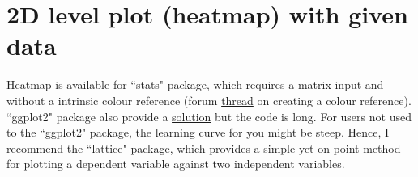 \documentclass[../note.tex]{subfiles} %
\begin{document}
\section{2D level plot (heatmap) with given data}
Heatmap is available for ``stats" package\autocite{Rcore}, which requires a matrix input and without a intrinsic colour reference (forum \href{https://stackoverflow.com/questions/9314658/colorbar-from-custom-colorramppalette}{thread} on creating a colour reference).  ``ggplot2" package\autocite{ggplot} also provide a \href{https://stackoverflow.com/questions/43772017/continuous-gradient-color-fixed-scale-heatmap-ggplot2}{solution} but the code is long.  For users not used to the ``ggplot2" package, the learning curve for you might be steep.  Hence, I recommend the ``lattice" package\autocite{lattice}, which provides a simple yet on-point method for plotting a dependent variable against two independent variables.
\end{document}
